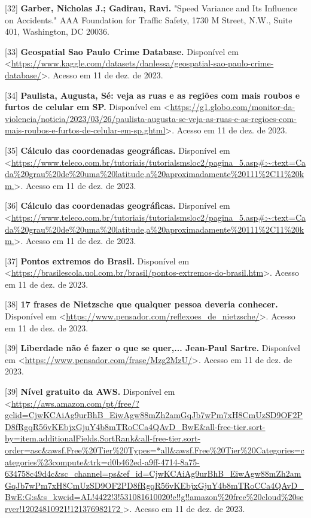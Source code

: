 [32] \textbf{Garber, Nicholas J.; Gadirau, Ravi.} "Speed Variance and Its Influence on Accidents." AAA Foundation for Traffic Safety, 1730 M Street, N.W., Suite 401, Washington, DC 20036.

[33] \textbf{Geospatial Sao Paulo Crime Database.} Disponível em <\url{https://www.kaggle.com/datasets/danlessa/geospatial-sao-paulo-crime-database/}>. Acesso em 11 de dez. de 2023.

[34] \textbf{Paulista, Augusta, Sé: veja as ruas e as regiões com mais roubos e furtos de celular em SP.} Disponível em <\url{https://g1.globo.com/monitor-da-violencia/noticia/2023/03/26/paulista-augusta-se-veja-as-ruas-e-as-regioes-com-mais-roubos-e-furtos-de-celular-em-sp.ghtml}>. Acesso em 11 de dez. de 2023.

[35] \textbf{Cálculo das coordenadas geográficas.} Disponível em <\url{https://www.teleco.com.br/tutoriais/tutorialsmsloc2/pagina_5.asp#:~:text=Cada%20grau%20de%20uma%20latitude,a%20aproximadamente%20111%2C11%20km.}>. Acesso em 11 de dez. de 2023.


[36] \textbf{Cálculo das coordenadas geográficas.} Disponível em <\url{https://www.teleco.com.br/tutoriais/tutorialsmsloc2/pagina_5.asp#:~:text=Cada%20grau%20de%20uma%20latitude,a%20aproximadamente%20111%2C11%20km.}>. Acesso em 11 de dez. de 2023.


[37] \textbf{Pontos extremos do Brasil.} Disponível em <\url{https://brasilescola.uol.com.br/brasil/pontos-extremos-do-brasil.htm}>. Acesso em 11 de dez. de 2023.

[38] \textbf{17 frases de Nietzsche que qualquer pessoa deveria conhecer.} Disponível em <\url{https://www.pensador.com/reflexoes_de_nietzsche/}>. Acesso em 11 de dez. de 2023.


[39] \textbf{Liberdade não é fazer o que se quer,... Jean-Paul Sartre.} Disponível em <\url{https://www.pensador.com/frase/Mzg2MzU/}>. Acesso em 11 de dez. de 2023.


[39] \textbf{Nível gratuito da AWS.} Disponível em <\url{https://aws.amazon.com/pt/free/?gclid=CjwKCAiAg9urBhB_EiwAgw88mZh2amGqJb7wPm7xH8CmUzSD9OF2PD8fRgqR56vKEbjxGjuY4b8mTRoCCa4QAvD_BwE&all-free-tier.sort-by=item.additionalFields.SortRank&all-free-tier.sort-order=asc&awsf.Free%
}>. Acesso em 11 de dez. de 2023.



